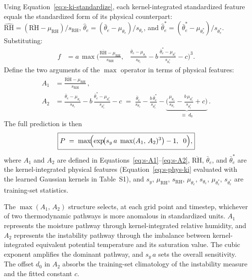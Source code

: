 Using Equation~\ref{eq:s-ki-standardize}, each kernel-integrated standardized
feature equals the standardized form of its physical counterpart:
$\widehat{\mathrm{RH}} = (\overline{\mathrm{RH}} -
\mu_{\mathrm{RH}})/s_{\mathrm{RH}}$, $\hat{\theta}_e = (\bar{\theta}_e -
\mu_{\theta_e})/s_{\theta_e}$, and $\hat{\theta}_e^* = (\bar{\theta}_e^* -
\mu_{\theta_e^*})/s_{\theta_e^*}$.  Substituting:
%
\begin{align}
  f &= a\,\max\!\Biggl(
       \frac{\overline{\mathrm{RH}} - \mu_{\mathrm{RH}}}{s_{\mathrm{RH}}},
       \;\;\;
       \frac{\bar{\theta}_e - \mu_{\theta_e}}{s_{\theta_e}}
       - b\,\frac{\bar{\theta}_e^* - \mu_{\theta_e^*}}{s_{\theta_e^*}}
       - c
       \Biggr)^{\!3}.
  \label{eq:s-sratm-expand}
\end{align}
%
Define the two arguments of the $\max$ operator in terms of physical features:
%
\begin{align}
  A_1 &= \frac{\overline{\mathrm{RH}} - \mu_{\mathrm{RH}}}
              {s_{\mathrm{RH}}}\,,
  \label{eq:s-A1}\\[6pt]
  A_2 &= \frac{\bar{\theta}_e - \mu_{\theta_e}}{s_{\theta_e}}
       - b\,\frac{\bar{\theta}_e^* - \mu_{\theta_e^*}}{s_{\theta_e^*}}
       - c
       \;=\; \frac{\bar{\theta}_e}{s_{\theta_e}}
       - \frac{b\,\bar{\theta}_e^*}{s_{\theta_e^*}}
       - \underbrace{\biggl(\frac{\mu_{\theta_e}}{s_{\theta_e}}
       - \frac{b\,\mu_{\theta_e^*}}{s_{\theta_e^*}} + c\biggr)}_{\displaystyle
       \equiv\; d_0}\,.
  \label{eq:s-A2}
\end{align}
%
The full prediction is then
%
\begin{equation}
  \boxed{P \;=\; \max\!\Bigl(\exp\!\bigl(
    s_y\,a\;\max(A_1,\,A_2)^3\bigr) - 1,\;\;0\Bigr),}
  \label{eq:s-sratm-phys}
\end{equation}
%
where $A_1$ and $A_2$ are defined in
Equations~\ref{eq:s-A1}--\ref{eq:s-A2}, $\overline{\mathrm{RH}}$,
$\bar{\theta}_e$, and $\bar{\theta}_e^*$ are the kernel-integrated physical
features (Equation~\ref{eq:s-phys-ki} evaluated with the learned Gaussian
kernels in Table~S1), and $s_y$, $\mu_{\mathrm{RH}}$, $s_{\mathrm{RH}}$,
$\mu_{\theta_e}$, $s_{\theta_e}$, $\mu_{\theta_e^*}$, $s_{\theta_e^*}$ are
training-set statistics.

The $\max(A_1,\,A_2)$ structure selects, at each grid point and timestep,
whichever of two thermodynamic pathways is more anomalous in standardized
units.  $A_1$ represents the moisture pathway through kernel-integrated
relative humidity, and $A_2$ represents the instability pathway through the
imbalance between kernel-integrated equivalent potential temperature and its
saturation value.  The cubic exponent amplifies the dominant pathway, and
$s_y\,a$ sets the overall sensitivity.  The offset $d_0$ in $A_2$ absorbs
the training-set climatology of the instability measure and the fitted
constant $c$.

